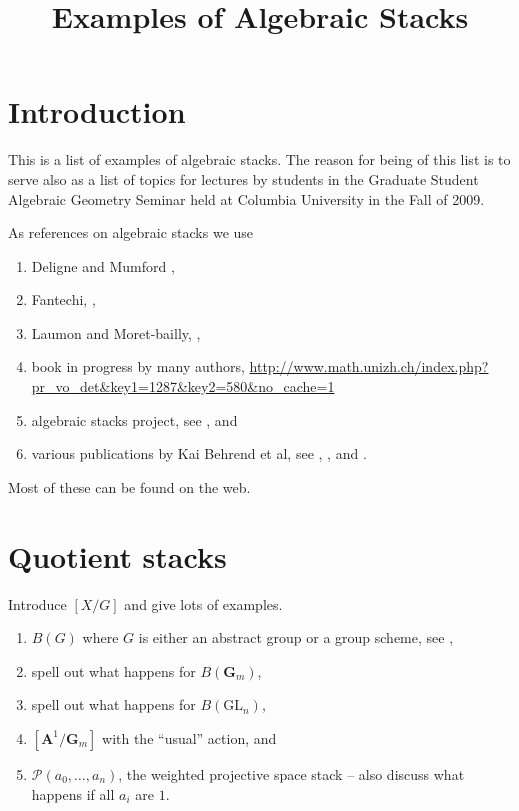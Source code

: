 

%


\title{Examples of Algebraic Stacks}


\maketitle

\label{section-phantom}

\tableofcontents

\section{Introduction}
\label{section-introduction}

\noindent
This is a list of examples of algebraic stacks.
The reason for being of this list is to serve also as a list of
topics for lectures by students in the Graduate Student Algebraic Geometry
Seminar held at Columbia University in the Fall of 2009.

\medskip\noindent
As references on algebraic stacks we use
\begin{enumerate}
\item Deligne and Mumford \cite[Section 4]{DM},
\item Fantechi, \cite{Fantechi},
\item Laumon and Moret-bailly, \cite{LM-B},
\item book in progress by many authors,
\url{http://www.math.unizh.ch/index.php?pr_vo_det&key1=1287&key2=580&no_cache=1}
\item algebraic stacks project, see \cite{stacks-project}, and
\item various publications by Kai Behrend et al, see
\cite{derived-l-adic-for-stacks},
\cite{cohomology-of-stacks}, and
\cite{uniformization-stacky-curves}.
\end{enumerate}
Most of these can be found on the web.

\section{Quotient stacks}
\label{section-quotient-stacks}

\noindent
Introduce $[X/G]$ and give lots of examples.
\begin{enumerate}
\item $B(G)$ where $G$ is either an abstract group or a group scheme, see
\cite[Examples \href{http://math.columbia.edu/algebraic_geometry/%
stacks-git/locate.php?tag=0370}{0370} and
\href{http://math.columbia.edu/algebraic_geometry/%
stacks-git/locate.php?tag=0371}{0371}]{stacks-project},
\item spell out what happens for $B(\mathbf{G}_m)$,
\item spell out what happens for $B(\text{GL}_n)$,
\item $[\mathbf{A}^1/\mathbf{G}_m]$ with the ``usual'' action, and
\item $\mathcal{P}(a_0, \ldots, a_n)$, the weighted projective space stack
-- also discuss what happens if all $a_i$ are $1$.
\end{enumerate}


